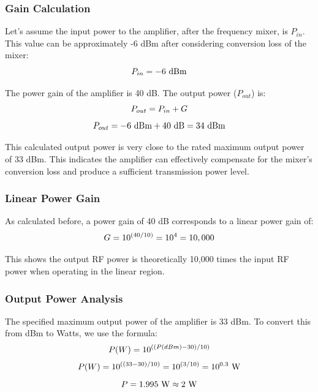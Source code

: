 \documentclass[12pt,a4paper]{report}
\begin{document}
	\subsubsection{Gain Calculation}
	Let's assume the input power to the amplifier, after the frequency mixer, is $P_{in}$. This value can be approximately -6 dBm after considering conversion loss of the mixer:
	\begingroup
	\setlength{\mathindent}{0pt}
	\begin{equation*}
		\hfill
		P_{in} = -6\ \text{dBm}
		\hfill
	\end{equation*}
	\endgroup
	
	The power gain of the amplifier is 40 dB. The output power ($P_{out}$) is:
	\begingroup
	\setlength{\mathindent}{0pt}
	\begin{equation*}
		\hfill
		P_{out} = P_{in} + G
		\hfill
	\end{equation*}
	\endgroup
	\begingroup
	\setlength{\mathindent}{0pt}
	\begin{equation*}
		\hfill
		P_{out} = -6\ \text{dBm} + 40\ \text{dB} = 34\ \text{dBm}
		\hfill
	\end{equation*}
	\endgroup
	
	This calculated output power is very close to the rated maximum output power of 33 dBm. This indicates the amplifier can effectively compensate for the mixer's conversion loss and produce a sufficient transmission power level.
	\subsubsection{Linear Power Gain}
	As calculated before, a power gain of 40 dB corresponds to a linear power gain of:
	\begingroup
	\setlength{\mathindent}{0pt}
	\begin{equation*}
		\hfill
		G = 10^{(40/10)} = 10^4 = 10,000
		\hfill
	\end{equation*}
	\endgroup
	
	This shows the output RF power is theoretically 10,000 times the input RF power when operating in the linear region.
	\subsubsection{Output Power Analysis}
	The specified maximum output power of the amplifier is 33 dBm. To convert this from dBm to Watts, we use the formula:
	\begingroup
	\setlength{\mathindent}{0pt}
	\begin{equation*}
		\hfill
		P(W) = 10^{((P(dBm) - 30)/10)}
		\hfill
	\end{equation*}
	\endgroup
	\begingroup
	\setlength{\mathindent}{0pt}
	\begin{equation*}
		\hfill
		P(W) = 10^{((33 - 30)/10)} = 10^{(3/10)} = 10^{0.3}\ \text{W}
		\hfill
	\end{equation*}
	\endgroup
	\begingroup
	\setlength{\mathindent}{0pt}
	\begin{equation*}
		\hfill
		P = 1.995\ \text{W} \approx 2\ \text{W}
		\hfill
	\end{equation*}
	\endgroup
	
\end{document}
